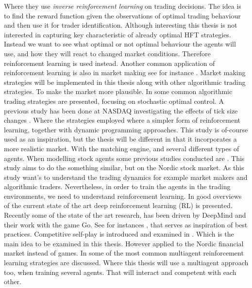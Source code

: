 \documentclass{kththesis}
\theoremstyle{definition}
\begin{document}
\newline
\newline
Where they use \textit{inverse reinforcement learning} on trading decisions. The idea is to find the reward function given the observations of optimal trading behaviour and then use it for trader identification. 
Although interesting this thesis is not interested in capturing key characteristic of already optimal HFT strategies. Instead we want to see what optimal or not optimal behaviour the agents will use, and how they will react to changed market conditions. Therefore reinforcement learning is used instead. Another common application of reinforcement learning is also in market making see for instance \parencite{jumadinova2010comparison,chan2001electronic, fernandez2015high, sherstov2004three}. Market making strategies will be implemented in this thesis along with other algorithmic trading strategies. To make the market more plausible. 
\newline
\newline
In \textcite{cartea2015algorithmic} some common algorithmic trading strategies are presented, focusing on stochastic optimal control.
A previous study has been done at NASDAQ investigating the effects of tick size changes \textcite{darley2007nasdaq}. Where the strategies employed where a simpler form of reinforcement learning, together with dynamic programming approaches. This study is of-course used as an inspiration, but the thesis will be different in that it incorporates a more realistic market. With the matching engine, and several different types of agents. When modelling stock agents some previous studies conducted are \parencite{pastore2015modelling, rutkauskas2009building}. This study aims to do the something similar, but on the Nordic stock market. As this study want's to understand the trading dynamics for example market makers and algorithmic traders. 
\newline
\newline
Nevertheless, in order to train the agents in the trading environments, we need to understand reinforcement learning. In \parencite{arulkumaran2017brief, mnih2015human, li2017deep} good overviews of the current state of the art deep reinforcement learning (RL) is presented.  Recently some of the state of the art research, has been driven by DeepMind and their work with the game Go. See for instances \parencite{silver2016mastering, silver2017mastering, vinyals2017starcraft}, that serves as inspiration of best practices. Competitive self-play is introduced and examined in \parencite{bansal2017emergent, schulman2017proximal}. Which is the main idea to be examined in this thesis. However applied to the Nordic financial market instead of games. In \parencite{busoniu2008comprehensive, bucsoniu2010multi} some of the most common multiagent reinforcement learning strategies are discussed. Where this thesis will use a multiagent approach too, when training several agents. That will interact and competent with each other. 
\end{document}
